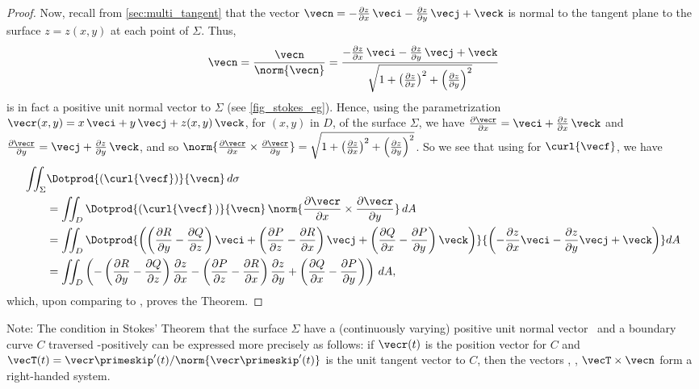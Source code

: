 \begin{proof}
 Now, recall from \autoref{sec:multi_tangent} that the vector $\vecn = -\frac{\partial z}{\partial x}\,\veci - \frac{\partial z}{\partial y}\,\vecj + \veck$ is normal to the tangent plane to the surface $z=z(x,y)$ at each point of $\Sigma$. Thus,
 \[
  \vecn = \frac{\vecn}{\norm{\vecn}} =
   \frac{-\frac{\partial z}{\partial x}\,\veci - \frac{\partial z}{\partial y}\,\vecj +
   \veck}{\sqrt{1 + \left( \tfrac{\partial z}{\partial x} \right)^2 +
   \left( \tfrac{\partial z}{\partial y} \right)^2}}
 \]
 is in fact a positive unit normal vector to $\Sigma$ (see \autoref{fig_stokes_eg}). Hence, using the parametrization $\vecr(x,y) = x\,\veci + y\,\vecj + z(x,y)\,\veck$, for $(x,y)$ in $D$, of the surface $\Sigma$, we have $\frac{\partial \vecr}{\partial x} = \veci + \frac{\partial z}{\partial x}\,\veck$ and $\frac{\partial \vecr}{\partial y} = \vecj + \frac{\partial z}{\partial y}\,\veck$, and so $\norm{\frac{\partial \vecr}{\partial x}\times\frac{\partial \vecr}{\partial y}} = \sqrt{1 + \left( \tfrac{\partial z}{\partial x} \right)^2 + \left( \tfrac{\partial z}{\partial y} \right)^2}$. So we see that using  for $\curl{\vecf}$, we have
 \begin{align*}
  \iint_{\Sigma} & \Dotprod{(\curl{\vecf})}{\vecn}\,d\sigma \\
  &=
   \iint_{D} \Dotprod{(\curl{\vecf}\,)}{\vecn}\,
   \norm{\frac{\partial \vecr}{\partial x}\times\frac{\partial \vecr}{\partial y}}\,dA\\
   &= \iint_{D} \Dotprod{\left( \left( \frac{\partial R}{\partial y} - \frac{\partial Q}{\partial z} \right)
    \veci + \left( \frac{\partial P}{\partial z} - \frac{\partial R}{\partial x} \right) \vecj +
    \left( \frac{\partial Q}{\partial x} - \frac{\partial P}{\partial y} \right) \veck
    \right)}{\left( -\frac{\partial z}{\partial x}\veci - \frac{\partial z}{\partial y}\vecj +
    \veck \right)} dA\\
   &= \iint_{D} \left(
    -\left( \frac{\partial R}{\partial y} - \frac{\partial Q}{\partial z} \right) \frac{\partial z}{\partial x}
    -\left( \frac{\partial P}{\partial z} - \frac{\partial R}{\partial x} \right) \frac{\partial z}{\partial y}
    + \left( \frac{\partial Q}{\partial x} - \frac{\partial P}{\partial y} \right) \right)\,dA ,
 \end{align*}
 which, upon comparing to , proves the Theorem.
\end{proof}

Note: The condition in Stokes' Theorem that the surface $\Sigma$ have a (continuously varying) positive unit normal vector \vecn\ and a boundary curve $C$ traversed \vecn-positively can be expressed more precisely as follows: if $\vecr(t)$ is the position vector for $C$ and $\vecT(t) = \vecr\primeskip'(t)/\norm{\vecr\primeskip'(t)}$ is the unit tangent vector to $C$, then the vectors \vecT, \vecn, $\vecT\times\vecn$ form a right-handed system.

